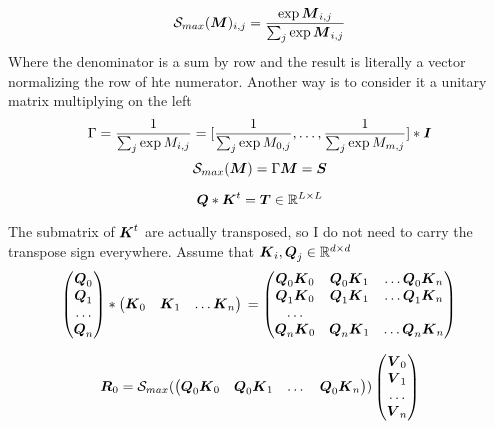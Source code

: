 \documentclass[conference]{IEEEtran}
\begin{document}
\begin{equation}
  \Smax{\Vc{M}}_{i,j}  = \Smaxd{\Vc{M}} 
\end{equation}
Where the denominator is a sum by row and the result is literally a
vector normalizing the row of hte numerator. Another way is to
consider it a unitary matrix multiplying on the left
\begin{equation}
  \label{eq:gamma}
  \Gamma= \frac{1}{\sum_j\exp{M_{i,j}}} = [ \frac{1}{\sum_j\exp{M_{0,j}}}, \dots,  \frac{1}{\sum_j\exp{M_{m,j}}} ] * \Vc{I}
\end{equation}
\begin{equation}
  \Smax{\Vc{M}}  = \Gamma \Vc{M} = \Vc{S}
\end{equation}

\begin{equation}
  {\boldsymbol Q}*{\boldsymbol K}^t = {\boldsymbol T} \in \mathbb{R}^{L\times L}
\end{equation}

The submatrix of ${\boldsymbol K}^t$ are actually transposed, so I do not need
to carry the transpose sign everywhere. Assume that ${\boldsymbol K}_i, {\boldsymbol Q}_j \in \mathbb{R}^{d\times d}$
{\small \begin{equation*}
  \label{eq:mat}
  \begin{pmatrix}
    \Vc{Q}_0  \\
    \Vc{Q}_1  \\
    \dots \\
    \Vc{Q}_n
  \end{pmatrix} * 
  \begin{pmatrix}
    \Vc{K}_0 & \Vc{K}_1  & \dots \Vc{K}_n \\
  \end{pmatrix}\\
  =
  \begin{pmatrix}
    \Vc{Q}_0\Vc{K}_0 & \Vc{Q}_0\Vc{K}_1  & \dots \Vc{Q}_0\Vc{K}_n \\
    \Vc{Q}_1\Vc{K}_0 & \Vc{Q}_1\Vc{K}_1  & \dots \Vc{Q}_1\Vc{K}_n \\
    \dots \\
    \Vc{Q}_n\Vc{K}_0 & \Vc{Q}_n\Vc{K}_1  & \dots \Vc{Q}_n\Vc{K}_n \\
  \end{pmatrix}\\
\end{equation*}
}

\begin{equation*}
  \Vc{R}_0 = \Smax{
    \begin{pmatrix}
      \Vc{Q}_0\Vc{K}_0 &  \Vc{Q}_0\Vc{K}_1  & \dots & \Vc{Q}_0\Vc{K}_n 
    \end{pmatrix}
  }
  \begin{pmatrix}
    \Vc{V}_0  \\
    \Vc{V}_1  \\
    \dots \\
    \Vc{V}_n
  \end{pmatrix} 
\end{equation*}
\end{document}
